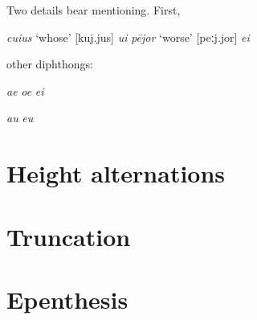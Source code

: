 Two details bear mentioning. First, 

\emph{cuius} `whose'
[kuj.jus]
\emph{ui}
\emph{pējor} `worse' 
[peːj.jor]
\emph{ei}

other diphthongs:

\emph{ae}
\emph{oe}
\emph{ei}

\emph{au}
\emph{eu}

\citet{Devine1977}

\section{Height alternations}

\section{Truncation}

\section{Epenthesis}

